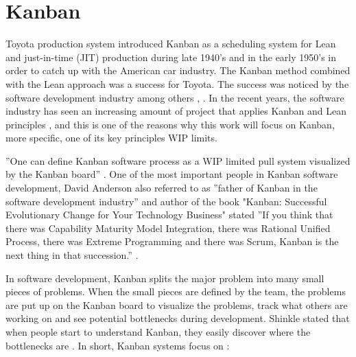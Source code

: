 \documentclass[UKenglish]{ifimaster}  %
\begin{document}
\section{Kanban}
\label{sec:Kan}

Toyota production system introduced Kanban as a scheduling system for Lean and just-in-time (JIT) production during late 1940's and in the early 1950's in order to catch up with the American car industry. The Kanban method combined with the Lean approach was a success for Toyota. The success was noticed by the software development industry among others \parencite{Conboy}, \parencite{ono1988toyota}. In the recent years, the software industry has seen an increasing amount of project that applies Kanban and Lean principles \parencite{DavidAnderson}, and this is one of the reasons why this work will focus on Kanban, more specific, one of its key principles WIP limits.

''One can define Kanban software process as a WIP limited pull system visualized by the Kanban board''  \parencite{DavidAnderson}.
One of the most important people in Kanban software development, David Anderson  also referred to as ''father of Kanban in the software development industry''  \parencite{InfoQ:2013:May:Online} and author of the book "Kanban: Successful Evolutionary Change for Your Technology Business"\parencite{0984521402} stated ''If you think that there was Capability Maturity Model Integration, there was Rational Unified Process, there was Extreme Programming and there was Scrum, Kanban is the next thing in that succession.''   \parencite{InfoQ} .

In software development, Kanban splits the major problem into many small pieces of problems. When the small pieces are defined by the team, the problems are put up on the Kanban board to visualize the problems, track what others are working on and see potential bottlenecks during development. Shinkle stated that when people start to understand Kanban, they easily discover where the bottlenecks are \parencite{Shinkle}. In short, Kanban systems focus on \parencite{DavidAnderson}:
\end{document}
